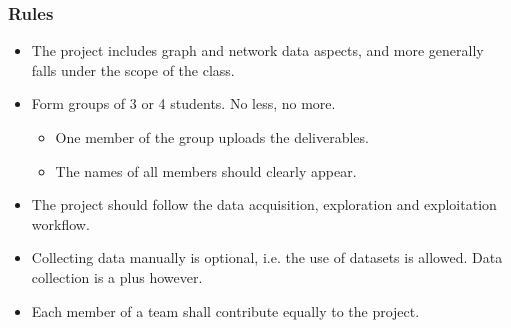 \documentclass{beamer}
\begin{document}

\begin{frame}
	\frametitle{Rules}
	\begin{itemize}
		\item The project includes graph and network data aspects, and more
			generally falls under the scope of the class.
		\vfill
		\item Form groups of 3 or 4 students. No less, no more.
			\begin{itemize}
				\item One member of the group uploads the deliverables.
				\item The names of all members should clearly appear.
			\end{itemize}
		\vfill
		\item The project should follow the data acquisition, exploration and
			exploitation workflow.
		\vfill
		\item Collecting data manually is optional, i.e. the use of datasets is
			allowed. Data collection is a plus however.
		\vfill
		\item Each member of a team shall contribute equally to the project.
	\end{itemize}
\end{frame}

\end{document}
